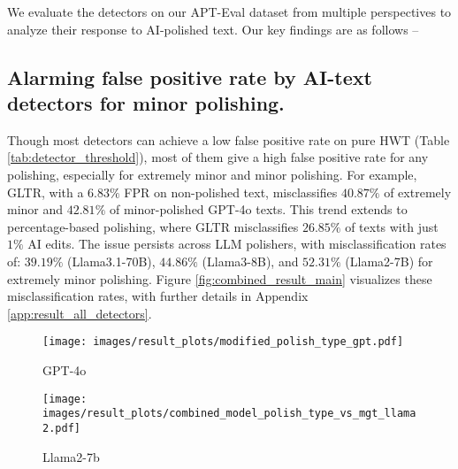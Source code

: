 We evaluate the detectors on our APT-Eval dataset from multiple perspectives to analyze their response to AI-polished text. Our key findings are as follows -- 


\subsection{Alarming false positive rate by AI-text detectors for minor polishing.} 
Though most detectors can achieve a low false positive rate on pure HWT (Table \ref{tab:detector_threshold}), most of them give a high false positive rate for any polishing, especially for extremely minor and minor polishing. 
For example, GLTR, with a $6.83\%$ FPR on non-polished text, misclassifies $40.87\%$ of extremely minor and $42.81\%$ of minor-polished GPT-4o texts.
This trend extends to percentage-based polishing, where GLTR misclassifies $26.85\%$ of texts with just $1\%$ AI edits.
The issue persists across LLM polishers, with misclassification rates of:
$39.19\%$ (Llama3.1-70B), $44.86\%$ (Llama3-8B), and $52.31\%$ (Llama2-7B) for extremely minor polishing. 
Figure \ref{fig:combined_result_main} visualizes these misclassification rates, with further details in Appendix \ref{app:result_all_detectors}.


\begin{figure*}[htbp]
    \centering
    \begin{minipage}{\textwidth} %
        \centering
        \begin{subfigure}{0.39\textwidth}
            \centering
            \texttt{[image: images/result\_plots/modified\_polish\_type\_gpt.pdf]}
            \caption{GPT-4o}
            \label{fig:gpt4_acc_overall}
        \end{subfigure}
        \hspace{2pt}
        \begin{subfigure}{0.55\textwidth}
            \centering
            \texttt{[image: images/result\_plots/combined\_model\_polish\_type\_vs\_mgt\_llama2.pdf]}
            \caption{Llama2-7b}
            \label{fig:llama2_acc_overall}
        \end{subfigure}
    \end{minipage}
    
    \caption{Ratio of degree-based AI-polished-texts (APT) predicted as AI-text by all detectors.}
    \label{fig:combined_result_main}
\end{figure*}


